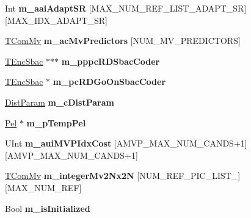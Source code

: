 \begin{DoxyCompactItemize}
\item 
\mbox{\label{class_t_enc_search_a5ad9c90682bb6dc6e3b8f7779abff3c8}} 
Int {\bfseries m\+\_\+aai\+Adapt\+SR} \mbox{[}M\+A\+X\+\_\+\+N\+U\+M\+\_\+\+R\+E\+F\+\_\+\+L\+I\+S\+T\+\_\+\+A\+D\+A\+P\+T\+\_\+\+SR\mbox{]}\mbox{[}M\+A\+X\+\_\+\+I\+D\+X\+\_\+\+A\+D\+A\+P\+T\+\_\+\+SR\mbox{]}
\item 
\mbox{\label{class_t_enc_search_ae59a52399c01013f7e539cbe50f78b03}} 
\hyperlink{class_t_com_mv}{T\+Com\+Mv} {\bfseries m\+\_\+ac\+Mv\+Predictors} \mbox{[}N\+U\+M\+\_\+\+M\+V\+\_\+\+P\+R\+E\+D\+I\+C\+T\+O\+RS\mbox{]}
\item 
\mbox{\label{class_t_enc_search_a632e39089e14b43e4d22da8a48d1ecca}} 
\hyperlink{class_t_enc_sbac}{T\+Enc\+Sbac} $\ast$$\ast$$\ast$ {\bfseries m\+\_\+pppc\+R\+D\+Sbac\+Coder}
\item 
\mbox{\label{class_t_enc_search_a2787f7e7308f345487d17d9b58c0e2b4}} 
\hyperlink{class_t_enc_sbac}{T\+Enc\+Sbac} $\ast$ {\bfseries m\+\_\+pc\+R\+D\+Go\+On\+Sbac\+Coder}
\item 
\mbox{\label{class_t_enc_search_a023e59ec1af97d556d41d21b48171066}} 
\hyperlink{class_dist_param}{Dist\+Param} {\bfseries m\+\_\+c\+Dist\+Param}
\item 
\mbox{\label{class_t_enc_search_ad63c9e77e9871427e295fbfa0a342346}} 
\hyperlink{_type_def_8h_af92141699657699b4b547be0c8517541}{Pel} $\ast$ {\bfseries m\+\_\+p\+Temp\+Pel}
\item 
\mbox{\label{class_t_enc_search_a019d2afdd7e84fc9d9cc96f468892afd}} 
U\+Int {\bfseries m\+\_\+aui\+M\+V\+P\+Idx\+Cost} \mbox{[}A\+M\+V\+P\+\_\+\+M\+A\+X\+\_\+\+N\+U\+M\+\_\+\+C\+A\+N\+DS+1\mbox{]}\mbox{[}A\+M\+V\+P\+\_\+\+M\+A\+X\+\_\+\+N\+U\+M\+\_\+\+C\+A\+N\+DS+1\mbox{]}
\item 
\mbox{\label{class_t_enc_search_a212f1bf9701ab649f386041a0a242aba}} 
\hyperlink{class_t_com_mv}{T\+Com\+Mv} {\bfseries m\+\_\+integer\+Mv2\+Nx2N} \mbox{[}N\+U\+M\+\_\+\+R\+E\+F\+\_\+\+P\+I\+C\+\_\+\+L\+I\+S\+T\+\_\mbox{]}\mbox{[}M\+A\+X\+\_\+\+N\+U\+M\+\_\+\+R\+EF\mbox{]}
\item 
\mbox{\label{class_t_enc_search_af4fe12bb35ff99d4b540da95b062109d}} 
Bool {\bfseries m\+\_\+is\+Initialized}
\end{DoxyCompactItemize}
